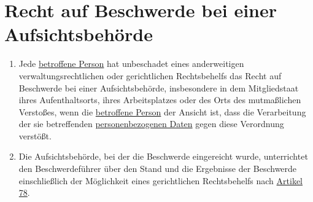 \chapter{Recht auf Beschwerde bei einer Aufsichtsbehörde}
\label{ch:77}


\begin{enumerate}

  \item Jede \hyperref[itm:04-1]{betroffene Person} hat unbeschadet eines anderweitigen verwaltungsrechtlichen oder gerichtlichen
   Rechtsbehelfs das Recht auf Beschwerde bei einer Aufsichtsbehörde, insbesondere in dem Mitgliedstaat ihres
   Aufenthaltsorts, ihres Arbeitsplatzes oder des Orts des mutmaßlichen Verstoßes, wenn die \hyperref[itm:04-1]{betroffene Person} der
   Ansicht ist, dass die Verarbeitung der sie betreffenden \hyperref[itm:04-1]{personenbezogenen Daten} gegen diese Verordnung verstößt.
  \label{itm:77-1}

  \item Die Aufsichtsbehörde, bei der die Beschwerde eingereicht wurde, unterrichtet den Beschwerdeführer über den Stand
   und die Ergebnisse der Beschwerde einschließlich der Möglichkeit eines gerichtlichen Rechtsbehelfs nach \hyperref
   [ch:78]{Artikel 78}.
  \label{itm:77-2}

\end{enumerate}



